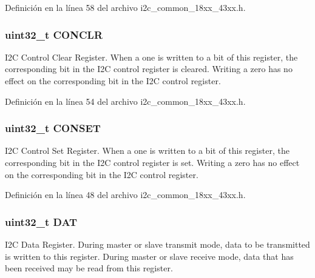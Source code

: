 Definición en la línea 58 del archivo i2c\+\_\+common\+\_\+18xx\+\_\+43xx.\+h.

\subsubsection[{\texorpdfstring{C\+O\+N\+C\+LR}{CONCLR}}]{ uint32\+\_\+t C\+O\+N\+C\+LR}\hypertarget{struct_l_p_c___i2_c___t_a7ff250ae8c92fad81187b4568ca394a3}{}\label{struct_l_p_c___i2_c___t_a7ff250ae8c92fad81187b4568ca394a3}
I2C Control Clear Register. When a one is written to a bit of this register, the corresponding bit in the I2C control register is cleared. Writing a zero has no effect on the corresponding bit in the I2C control register. 

Definición en la línea 54 del archivo i2c\+\_\+common\+\_\+18xx\+\_\+43xx.\+h.

\subsubsection[{\texorpdfstring{C\+O\+N\+S\+ET}{CONSET}}]{ uint32\+\_\+t C\+O\+N\+S\+ET}\hypertarget{struct_l_p_c___i2_c___t_a48a487253b2e87b303396c5082690aa2}{}\label{struct_l_p_c___i2_c___t_a48a487253b2e87b303396c5082690aa2}
I2C Control Set Register. When a one is written to a bit of this register, the corresponding bit in the I2C control register is set. Writing a zero has no effect on the corresponding bit in the I2C control register. 

Definición en la línea 48 del archivo i2c\+\_\+common\+\_\+18xx\+\_\+43xx.\+h.

\subsubsection[{\texorpdfstring{D\+AT}{DAT}}]{ uint32\+\_\+t D\+AT}\hypertarget{struct_l_p_c___i2_c___t_a936ba4d835b77f18994c86e64b2392b1}{}\label{struct_l_p_c___i2_c___t_a936ba4d835b77f18994c86e64b2392b1}
I2C Data Register. During master or slave transmit mode, data to be transmitted is written to this register. During master or slave receive mode, data that has been received may be read from this register. 

